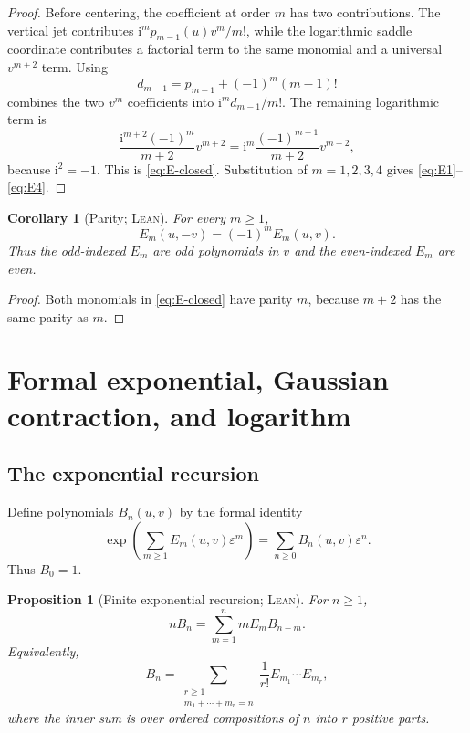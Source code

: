 \documentclass[11pt,oneside]{article}
\newtheorem{proposition}[theorem]{Proposition}
\newtheorem{corollary}[theorem]{Corollary}
\theoremstyle{definition}
\theoremstyle{remark}
\newcommand{\ii}{\mathrm i}
\newcommand{\Formalized}{\textsc{Lean}}
\begin{document}
\begin{proof}
Before centering, the coefficient at order $m$ has two contributions.
The vertical jet contributes $\ii^m p_{m-1}(u)v^m/m!$, while the
logarithmic saddle coordinate contributes a factorial term to the same
monomial and a universal $v^{m+2}$ term.  Using
\[
 d_{m-1}=p_{m-1}+(-1)^m(m-1)!
\]
combines the two $v^m$ coefficients into
$\ii^m d_{m-1}/m!$.  The remaining logarithmic term is
\[
 \frac{\ii^{m+2}(-1)^m}{m+2}v^{m+2}
 =\ii^m\frac{(-1)^{m+1}}{m+2}v^{m+2},
\]
because $\ii^2=-1$.  This is \eqref{eq:E-closed}.  Substitution of
$m=1,2,3,4$ gives \eqref{eq:E1}--\eqref{eq:E4}.
\end{proof}

\begin{corollary}[Parity; \Formalized]
\label{cor:E-parity}
For every $m\geq1$,
\[
 E_m(u,-v)=(-1)^mE_m(u,v).
\]
Thus the odd-indexed $E_m$ are odd polynomials in $v$ and the
even-indexed $E_m$ are even.
\end{corollary}

\begin{proof}
Both monomials in \eqref{eq:E-closed} have parity $m$, because $m+2$ has
the same parity as $m$.
\end{proof}

\section{Formal exponential, Gaussian contraction, and logarithm}
\label{sec:coefficient-formulas}

\subsection{The exponential recursion}

Define polynomials $B_n(u,v)$ by the formal identity
\begin{equation}
 \exp\!\left(\sum_{m\geq1}E_m(u,v)\varepsilon^m\right)
 =\sum_{n\geq0}B_n(u,v)\varepsilon^n.
 \label{eq:B-definition}
\end{equation}
Thus $B_0=1$.

\begin{proposition}[Finite exponential recursion; \Formalized]
\label{prop:exp-recursion}
For $n\geq1$,
\begin{equation}
 nB_n=\sum_{m=1}^n mE_mB_{n-m}. \label{eq:B-recursion}
\end{equation}
Equivalently,
\[
 B_n=\sum_{\substack{r\geq1\\m_1+\cdots+m_r=n}}
 \frac1{r!}E_{m_1}\cdots E_{m_r},
\]
where the inner sum is over ordered compositions of $n$ into $r$ positive
parts.
\end{proposition}
\end{document}
